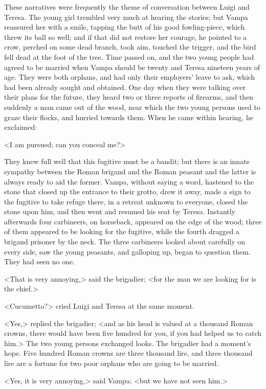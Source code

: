 {These narratives were frequently the theme of conversation between Luigi and Teresa. The young girl trembled very much at hearing the stories; but Vampa reassured her with a smile, tapping the butt of his good fowling-piece, which threw its ball so well; and if that did not restore her courage, he pointed to a crow, perched on some dead branch, took aim, touched the trigger, and the bird fell dead at the foot of the tree. Time passed on, and the two young people had agreed to be married when Vampa should be twenty and Teresa nineteen years of age. They were both orphans, and had only their employers' leave to ask, which had been already sought and obtained. One day when they were talking over their plans for the future, they heard two or three reports of firearms, and then suddenly a man came out of the wood, near which the two young persons used to graze their flocks, and hurried towards them. When he came within hearing, he exclaimed: 

 <I am pursued; can you conceal me?> 

They knew full well that this fugitive must be a bandit; but there is an innate sympathy between the Roman brigand and the Roman peasant and the latter is always ready to aid the former. Vampa, without saying a word, hastened to the stone that closed up the entrance to their grotto, drew it away, made a sign to the fugitive to take refuge there, in a retreat unknown to everyone, closed the stone upon him, and then went and resumed his seat by Teresa. Instantly afterwards four carbineers, on horseback, appeared on the edge of the wood; three of them appeared to be looking for the fugitive, while the fourth dragged a brigand prisoner by the neck. The three carbineers looked about carefully on every side, saw the young peasants, and galloping up, began to question them. They had seen no one. 

<That is very annoying,> said the brigadier; <for the man we are looking for is the chief.> 

<Cucumetto?> cried Luigi and Teresa at the same moment. 

<Yes,> replied the brigadier; <and as his head is valued at a thousand Roman crowns, there would have been five hundred for you, if you had helped us to catch him.> The two young persons exchanged looks. The brigadier had a moment's hope. Five hundred Roman crowns are three thousand lire, and three thousand lire are a fortune for two poor orphans who are going to be married. 

<Yes, it is very annoying,> said Vampa; <but we have not seen him.> 

}
